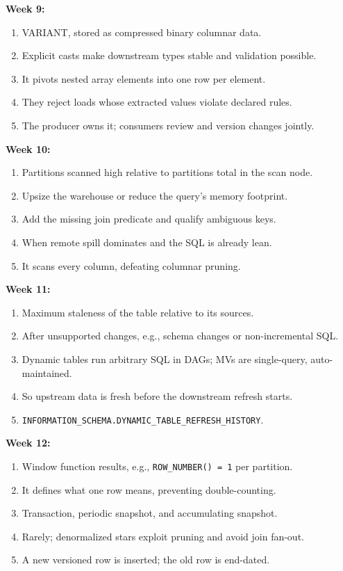 \documentclass[11pt, a4paper]{article}
\begin{document}
\noindent\textbf{Week 9:}
\begin{enumerate}[nosep, leftmargin=6mm]
    \item VARIANT, stored as compressed binary columnar data.
    \item Explicit casts make downstream types stable and validation possible.
    \item It pivots nested array elements into one row per element.
    \item They reject loads whose extracted values violate declared rules.
    \item The producer owns it; consumers review and version changes jointly.
\end{enumerate}
\noindent\textbf{Week 10:}
\begin{enumerate}[nosep, leftmargin=6mm]
    \item Partitions scanned high relative to partitions total in the scan node.
    \item Upsize the warehouse or reduce the query's memory footprint.
    \item Add the missing join predicate and qualify ambiguous keys.
    \item When remote spill dominates and the SQL is already lean.
    \item It scans every column, defeating columnar pruning.
\end{enumerate}
\noindent\textbf{Week 11:}
\begin{enumerate}[nosep, leftmargin=6mm]
    \item Maximum staleness of the table relative to its sources.
    \item After unsupported changes, e.g., schema changes or non-incremental SQL.
    \item Dynamic tables run arbitrary SQL in DAGs; MVs are single-query, auto-maintained.
    \item So upstream data is fresh before the downstream refresh starts.
    \item \texttt{INFORMATION\_SCHEMA.DYNAMIC\_TABLE\_REFRESH\_HISTORY}.
\end{enumerate}
\noindent\textbf{Week 12:}
\begin{enumerate}[nosep, leftmargin=6mm]
    \item Window function results, e.g., \texttt{ROW\_NUMBER() = 1} per partition.
    \item It defines what one row means, preventing double-counting.
    \item Transaction, periodic snapshot, and accumulating snapshot.
    \item Rarely; denormalized stars exploit pruning and avoid join fan-out.
    \item A new versioned row is inserted; the old row is end-dated.
\end{enumerate}
\end{document}
